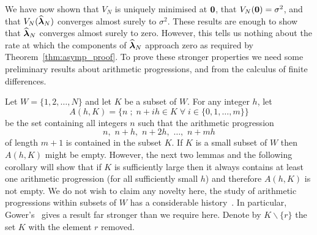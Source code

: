 \documentclass[aap,preprint]{imsart}
\newcommand{\prob}{\operatorname{Pr}}
\renewcommand{\mid}{\; ; \;}
\newtheorem{lemma}{Lemma}
\begin{document}

We have now shown that $V_N$ is uniquely minimised at $\boldsymbol{0}$, that $V_N(\boldsymbol{0}) = \sigma^2$, and that $V_N(\widehat{\boldsymbol{\lambda}}_N)$ converges almost surely to $\sigma^2$.  These results are enough to show that $\widehat{\boldsymbol{\lambda}}_N$ converges almost surely to zero.  However, this tells us nothing about the rate at which the components of $\widehat{\boldsymbol{\lambda}}_N$ approach zero as required by Theorem~\ref{thm:asymp_proof}.  To prove these stronger properties we need some preliminary results about arithmetic progressions, and from the calculus of finite differences.
 
Let $W = \{1,2,\dots, N\}$ and let $K$ be a subset of $W$.  For any integer $h$, let
\begin{equation} \label{eq:S(h,G)def} 
A(h,K) = \big\{ n \mid n + ih \in K \;\forall\; i \in \{0,1,\dots,m\} \big\}
\end{equation}
be the set containing all integers $n$ such that the arithmetic progression
\[
n, \,\, n + h, \,\, n + 2h, \,\, \dots, \,\, n + mh
\]
of length $m+1$ is contained in the subset $K$.  If $K$ is a small subset of $W$ then $A(h,K)$ might be empty. However, the next two lemmas and the following corollary will show that if $K$ is sufficiently large then it always contains at least one arithmetic progression (for all sufficiently small $h$) and therefore $A(h,K)$ is not empty. We do not wish to claim any novelty here, the study of arithmetic progressions within subsets of $W$ has a considerable history~\cite{Erdos_on_some_sequence_of_integers1936,Szemeredi_setint_no_k_arth1975,Gowers_new_proof2001}.  In particular, Gower's~\cite[Theorem 1.3]{Gowers_new_proof2001} gives a result far stronger than we require here.  Denote by $K \backslash \{r\}$ the set $K$ with the element $r$ removed.
\end{document}
